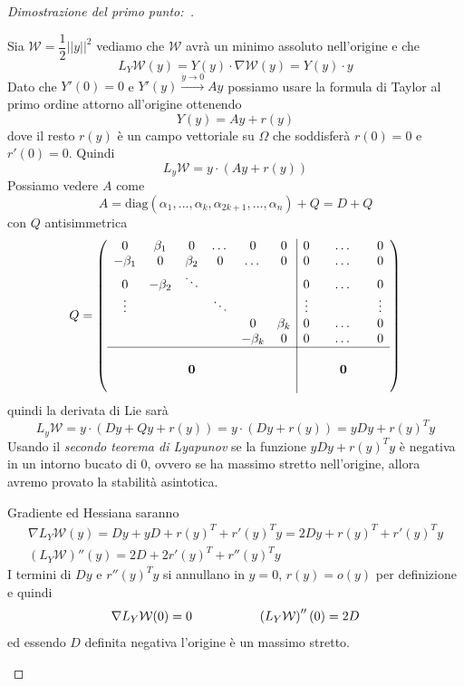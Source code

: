 \documentclass[11pt,a4paper,twoside]{book}
\newenvironment{dimo}[1][\proofname]{
	\begin{tcolorbox}[
	breakable, 
	enhanced, 
	interior hidden, 
	frame hidden, 
	borderline west = {1pt}{0pt}{gray}, 
	top=0pt, bottom=0pt, left=0pt]
\begin{proof}[#1:~]
}
{
\end{proof}
\end{tcolorbox}
}
\theoremstyle{esss}
\theoremstyle{dotless}
\numberwithin{equation}{section} %
\begin{document}
\begin{dimo}[Dimostrazione del primo punto]
\begin{itemize}
Sia $\mathcal{W}=\dfrac{1}{2}\left|\left|y\right|\right|^2$ vediamo che $\mathcal{W}$ avrà un minimo assoluto nell'origine e che 
\[
L_Y\mathcal{W}(y)=Y(y)\cdot\nabla\mathcal{W}(y)=Y(y)\cdot y
\]
Dato che $Y'(0)=0$ e $Y'(y)\overset{y\rightarrow 0}{\rightarrow} Ay$ possiamo usare la formula di Taylor al primo ordine attorno all'origine ottenendo
\[
Y(y)=Ay+r(y)
\]
dove il resto $r(y)$ è un campo vettoriale su $\Omega$ che soddisferà $r(0)=0$ e $r'(0)=0$.
Quindi
\[
L_y\mathcal{W}=y\cdot \left( Ay+r(y) \right)
\]
Possiamo vedere $A$ come 
\[
A=\text{diag}(\alpha_1,...,\alpha_k,\alpha_{2k+1},...,\alpha_n) + Q = D+Q
\] 
con $Q$ antisimmetrica
\[
Q=\left(\begin{array}{cccccc|ccccc}
0 & \beta_1  & 0 & \dots &   0 &0 &0 & &\dots & &  0 \\ 
-\beta_1 & 0 & \beta_2  & 0 & \dots &0  &0 &  &\dots & &  0 \\  
0 & -\beta_2 &  \ddots  & & & & 0 & & \dots & & 0 \\
\vdots &  & & \ddots &  & & \vdots & & & & \vdots \\ 
 &  & & & 0 &\beta_k & 0 & & \dots &  & 0 \\ 
 &  & & & -\beta_k & 0 & 0 & &\dots & &  0 \\
 \hline
 &  & & &  &  &  & &  & & \\
 &  & \textbf{0} & &  &  &  & & \textbf{0} & &  \\
 &  & & &  & & & & & & \\
\end{array}\right)
\]
quindi la derivata di Lie sarà
\[
L_y\mathcal{W}=y\cdot \left(Dy + Qy +r(y) \right) =
y\cdot \left( Dy +r(y) \right) = y Dy + r(y)^T y
\]
Usando il \textit{secondo teorema di Lyapunov} se la funzione $yDy+r(y)^Ty$ è negativa in un intorno bucato di $0$, ovvero se ha massimo stretto nell'origine, allora avremo provato la stabilità asintotica.

Gradiente ed Hessiana saranno
\begin{gather*}
\nabla L_Y\mathcal{W}(y)=Dy+yD+r(y)^T+r'(y)^Ty=2Dy+r(y)^T+r'(y)^Ty \\
\left( L_Y\mathcal{W} \right)''(y) = 2D + 2r'(y)^T + r''(y)^Ty
\end{gather*}
I termini di $Dy$ e $r''(y)^Ty$ si annullano in $y=0$, $r(y)=o(y)$ per definizione e quindi
\[
\nabla L_Y\mathcal{W}(0)= 0 \hspace{0.15\linewidth} \left(L_Y\mathcal{W} \right)''(0)=2D
\]
ed essendo $D$ definita negativa l'origine è un massimo stretto. \qedhere
\end{itemize}
\end{dimo}
\end{document}
